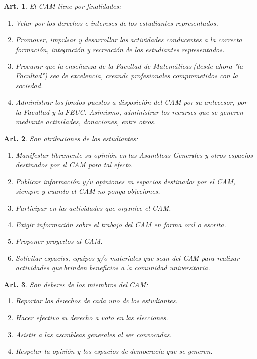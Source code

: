 \documentclass[letterpaper,11pt]{article}
\theoremstyle{plain}
\newtheorem{art}{Art.} %
\begin{document}
\begin{art}\label{finalidadesCAM}
	El CAM tiene por finalidades:
	\begin{enumerate}
		\item Velar por los derechos e intereses de los estudiantes representados.
		\item Promover, impulsar y desarrollar las actividades conducentes a la correcta formación, integración y recreación de los estudiantes representados.
		\item Procurar que la enseñanza de la Facultad de Matemáticas (desde ahora "la Facultad") sea de excelencia, creando profesionales comprometidos con la sociedad.
		\item Administrar los fondos puestos a disposición del CAM por su antecesor, por la Facultad y la FEUC. Asimismo, administrar los recursos que se generen mediante actividades, donaciones, entre otros.
	\end{enumerate}
\end{art}

\begin{art}\label{atribucionesEstudiantes}
	Son atribuciones de los estudiantes:
	\begin{enumerate}
		\item Manifestar libremente su opinión en las Asambleas Generales y otros espacios destinados por el CAM para tal efecto.
		\item Publicar información y/u opiniones en espacios destinados por el CAM, siempre y cuando el CAM no ponga objeciones.
		\item Participar en las actividades que organice el CAM.
		\item Exigir información sobre el trabajo del CAM en forma oral o escrita.
		\item Proponer proyectos al CAM.
		\item Solicitar espacios, equipos y/o materiales que sean del CAM para realizar actividades que brinden beneficios a la comunidad universitaria.
	\end{enumerate}
\end{art}

\begin{art}\label{deberesCAM}
	Son deberes de los miembros del CAM:
	\begin{enumerate}
		\item Reportar los derechos de cada uno de los estudiantes.
		\item Hacer efectivo su derecho a voto en las elecciones.
		\item Asistir a las asambleas generales al ser convocadas.
		\item Respetar la opinión y los espacios de democracia que se generen.
	\end{enumerate}
\end{art}
\end{document}
